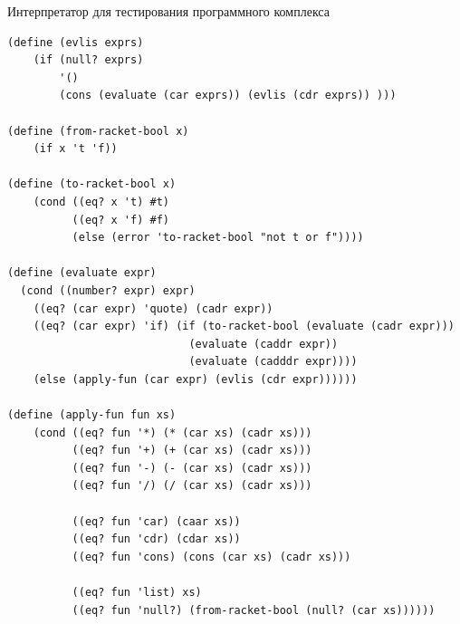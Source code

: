 \documentclass[14pt, russian]{scrartcl}
\newenvironment{longlisting}{\captionsetup{type=listing}}{}
\begin{document}
\begin{longlisting}
\caption{Интерпретатор для тестирования программного комплекса}
\label{lst:intptscm}
\begin{verbatim}
(define (evlis exprs)
    (if (null? exprs)
        '()
        (cons (evaluate (car exprs)) (evlis (cdr exprs)) )))

(define (from-racket-bool x)
    (if x 't 'f))

(define (to-racket-bool x)
    (cond ((eq? x 't) #t)
          ((eq? x 'f) #f)
          (else (error 'to-racket-bool "not t or f"))))

(define (evaluate expr)
  (cond ((number? expr) expr)
    ((eq? (car expr) 'quote) (cadr expr))
    ((eq? (car expr) 'if) (if (to-racket-bool (evaluate (cadr expr)))
                            (evaluate (caddr expr))
                            (evaluate (cadddr expr))))
    (else (apply-fun (car expr) (evlis (cdr expr))))))
                            
(define (apply-fun fun xs)
    (cond ((eq? fun '*) (* (car xs) (cadr xs)))
          ((eq? fun '+) (+ (car xs) (cadr xs)))
          ((eq? fun '-) (- (car xs) (cadr xs)))
          ((eq? fun '/) (/ (car xs) (cadr xs)))
          
          ((eq? fun 'car) (caar xs))
          ((eq? fun 'cdr) (cdar xs))
          ((eq? fun 'cons) (cons (car xs) (cadr xs)))
          
          ((eq? fun 'list) xs)
          ((eq? fun 'null?) (from-racket-bool (null? (car xs))))))
\end{verbatim}
\end{longlisting}
\end{document}
